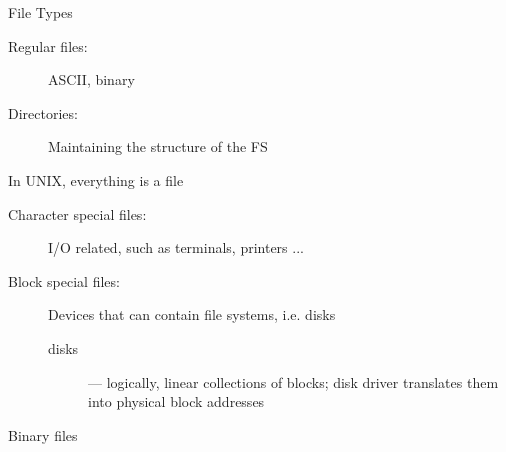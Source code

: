 \begin{frame}{File Types}
  \begin{description}
  \item[Regular files:] ASCII, binary
  \item[Directories:] Maintaining the structure of the FS
  \end{description}
  \begin{block}{In UNIX, everything is a file}
    \begin{description}
    \item[Character special files:] I/O related, such as terminals, printers ...
    \item[Block special files:] Devices that can contain file systems, i.e. disks
      \begin{description}
      \item[disks] --- logically, linear collections of blocks; disk driver translates
        them into physical block addresses
      \end{description}
    \end{description}
  \end{block}
\end{frame}

\begin{frame}
  \begin{block}{Binary files}
    \begin{center}
       
    \end{center}
  \end{block}
\end{frame}

